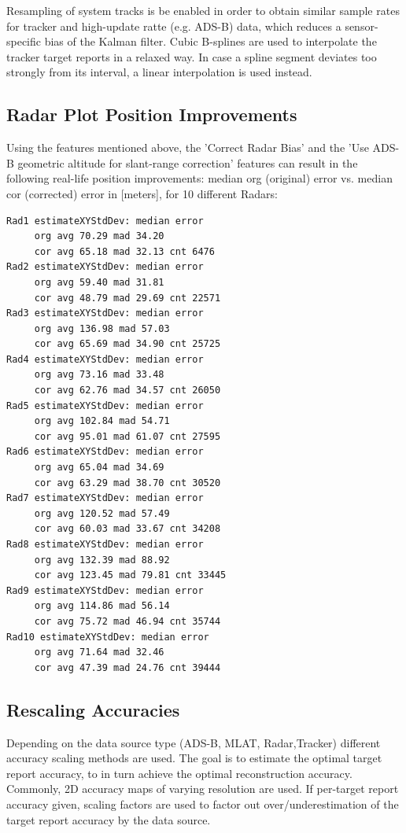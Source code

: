 \begin{itemize}
Resampling of system tracks is be enabled in order to obtain similar sample rates for tracker and high-update ratte (e.g. ADS-B) data, which reduces a sensor-specific bias of the Kalman filter. Cubic B-splines are used to interpolate the tracker target
reports in a relaxed way. In case a spline segment deviates too strongly from its interval, a linear interpolation is 
used instead. \\

\subsection{Radar Plot Position Improvements}

Using the features mentioned above, the 'Correct Radar Bias' and the 'Use ADS-B geometric altitude for slant-range correction' features can result in the following real-life position improvements: median org (original) error vs. median cor (corrected) error in [meters], for 10 different Radars:

\begin{lstlisting}
Rad1 estimateXYStdDev: median error
	 org avg 70.29 mad 34.20
	 cor avg 65.18 mad 32.13 cnt 6476
Rad2 estimateXYStdDev: median error
	 org avg 59.40 mad 31.81
	 cor avg 48.79 mad 29.69 cnt 22571
Rad3 estimateXYStdDev: median error
	 org avg 136.98 mad 57.03
	 cor avg 65.69 mad 34.90 cnt 25725
Rad4 estimateXYStdDev: median error
	 org avg 73.16 mad 33.48
	 cor avg 62.76 mad 34.57 cnt 26050
Rad5 estimateXYStdDev: median error
	 org avg 102.84 mad 54.71
	 cor avg 95.01 mad 61.07 cnt 27595
Rad6 estimateXYStdDev: median error
	 org avg 65.04 mad 34.69
	 cor avg 63.29 mad 38.70 cnt 30520
Rad7 estimateXYStdDev: median error
	 org avg 120.52 mad 57.49
	 cor avg 60.03 mad 33.67 cnt 34208
Rad8 estimateXYStdDev: median error
	 org avg 132.39 mad 88.92
	 cor avg 123.45 mad 79.81 cnt 33445
Rad9 estimateXYStdDev: median error
	 org avg 114.86 mad 56.14
	 cor avg 75.72 mad 46.94 cnt 35744
Rad10 estimateXYStdDev: median error
	 org avg 71.64 mad 32.46
	 cor avg 47.39 mad 24.76 cnt 39444
\end{lstlisting}

\subsection{Rescaling Accuracies}

Depending on the data source type (ADS-B, MLAT, Radar,Tracker) different accuracy scaling methods are used. The goal is to estimate the optimal target report accuracy, to in turn achieve the optimal reconstruction accuracy. Commonly, 2D accuracy maps of varying resolution are used. If per-target report accuracy given, scaling factors are used to factor out over/underestimation of the target report accuracy by the data source.


\end{itemize}
